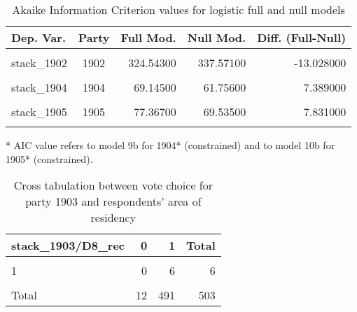 \documentclass[
]{article}
\begin{document}
\begin{table}[!h]

\caption{\label{tab:unnamed-chunk-125}Akaike Information Criterion values for logistic full and null models 
        \label{table:logit_aic_mt}}
\centering
\begin{threeparttable}
\begin{tabular}[t]{lcrrr}
\toprule
Dep. Var. & Party & Full Mod. & Null Mod. & Diff. (Full-Null)\\
\midrule
\cellcolor{gray!6}{stack\_1901} & \cellcolor{gray!6}{1901} & \cellcolor{gray!6}{429.65800} & \cellcolor{gray!6}{449.66400} & \cellcolor{gray!6}{-20.006000}\\
stack\_1902 & 1902 & 324.54300 & 337.57100 & -13.028000\\
\cellcolor{gray!6}{stack\_1903} & \cellcolor{gray!6}{1903} & \cellcolor{gray!6}{52.50500} & \cellcolor{gray!6}{53.63500} & \cellcolor{gray!6}{-1.131000}\\
stack\_1904 & 1904 & 69.14500 & 61.75600 & 7.389000\\
\cellcolor{gray!6}{stack\_1904*} & \cellcolor{gray!6}{1904} & \cellcolor{gray!6}{70.49792} & \cellcolor{gray!6}{61.75601} & \cellcolor{gray!6}{8.741919}\\
\addlinespace
stack\_1905 & 1905 & 77.36700 & 69.53500 & 7.831000\\
\cellcolor{gray!6}{stack\_1905*} & \cellcolor{gray!6}{1905} & \cellcolor{gray!6}{74.42784} & \cellcolor{gray!6}{69.53533} & \cellcolor{gray!6}{4.892508}\\
\bottomrule
\end{tabular}
\begin{tablenotes}[para]
\item[*] AIC value refers to model 9b for 1904* (constrained) and to model 10b for 1905* (constrained).
\end{tablenotes}
\end{threeparttable}
\end{table}

\begin{table}

\caption{\label{tab:unnamed-chunk-126}Cross tabulation between vote choice for party 1903 and respondents' area of                       residency 
                   \label{table:crosstab_3_1_mt}}
\centering
\begin{tabular}[t]{l|r|r|r}
\hline
stack\_1903/D8\_rec & 0 & 1 & Total\\
\hline
\cellcolor{gray!6}{0} & \cellcolor{gray!6}{4} & \cellcolor{gray!6}{367} & \cellcolor{gray!6}{371}\\
\hline
1 & 0 & 6 & 6\\
\hline
\cellcolor{gray!6}{NA} & \cellcolor{gray!6}{8} & \cellcolor{gray!6}{118} & \cellcolor{gray!6}{126}\\
\hline
Total & 12 & 491 & 503\\
\hline
\end{tabular}
\end{table}
\end{document}

